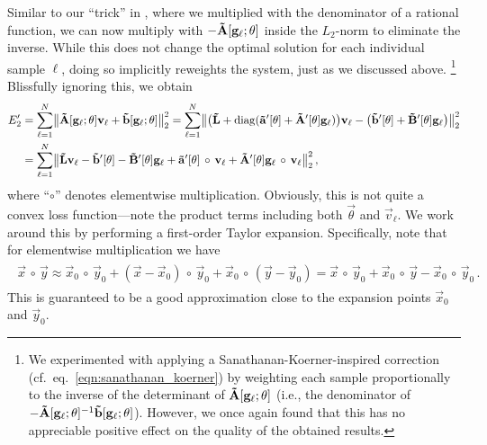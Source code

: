 Similar to our \enquote{trick} in , where we multiplied with the denominator of a rational function, we can now multiply with $-\mathbf{\tilde A}[\mathbf{g}_\ell; \mathbf{\theta}]$ inside the $L_2$-norm to eliminate the inverse.
While this does not change the optimal solution for each individual sample $\ell$, doing so implicitly reweights the system, just as we discussed above.%
\footnote{We experimented with applying a Sanathanan-Koerner-inspired correction (cf.~eq.~\ref{eqn:sanathanan_koerner}) by weighting each sample proportionally to the inverse of the determinant of $\mathbf{\tilde A}[\mathbf{g}_\ell; \mathbf{\theta}]$ (i.e., the denominator of $-\mathbf{\tilde A}[\mathbf{g}_\ell; \mathbf{\theta}]^{-1} \mathbf{\tilde b}[\mathbf{g}_\ell; \mathbf{\theta}]$).
However, we once again found that this has no appreciable positive effect on the quality of the obtained results.}
Blissfully ignoring this, we obtain
\begin{align*}
	E_2' &= \sum_{\ell = 1}^N \bigl\| \mathbf{\tilde A}[\mathbf{g}_\ell; \mathbf{\theta}] \mathbf{v}_\ell + \mathbf{\tilde b}[\mathbf{g}_\ell; \mathbf{\theta}] \bigr\|_2^2
	   = \sum_{\ell = 1}^N
	   \bigl\|
	   \bigl(\mathbf{\tilde L} + \operatorname{\mathrm{diag}}(\mathbf{\tilde a}'[\mathbf{\theta}] + \mathbf{\tilde A}'[\mathbf{\theta}] \mathbf{g}_\ell) \bigr) \mathbf{v}_\ell -
	  	  	        \bigl(\mathbf{\tilde b}'[\mathbf{\theta}] + \mathbf{\tilde B}'[\mathbf{\theta}] \mathbf{g}_\ell  \bigr)
	  \bigr\|_2^2 \\
	  &= \sum_{\ell = 1}^N
	  	   \bigl\|
	  	     \mathbf{\tilde L} \mathbf{v}_\ell
	  	   - \mathbf{\tilde b}'[\mathbf{\theta}] 
	  	   - \mathbf{\tilde B}'[\mathbf{\theta}] \mathbf{g}_\ell
	  	   + \mathbf{\tilde a}'[\mathbf{\theta}] \, \circ \, \mathbf{v}_\ell
	  	   + \mathbf{\tilde A}'[\mathbf{\theta}] \mathbf{g}_\ell \, \circ \, \mathbf{v}_\ell
 	  \bigr\|_2^2 \,,
\end{align*}
where \enquote{$\circ$} denotes elementwise multiplication.
Obviously, this is not quite a convex loss function---note the product terms including both $\vec \theta$ and $\vec v_\ell$. We work around this by performing a first-order Taylor expansion.
Specifically, note that for elementwise multiplication we have
\begin{align}
	\begin{aligned}
	\vec x \, \circ \, \vec y
	\approx \vec x_0 \, \circ \, \vec y_0 + (\vec x - \vec x_0) \, \circ \, \vec y_0 + \vec x_0 \, \circ \, (\vec y - \vec y_0)
	= \vec x \, \circ \, \vec y_0 + \vec x_0 \, \circ \, \vec y - \vec x_0 \, \circ \, \vec y_0 \,.
	\end{aligned}
	\label{eqn:nlif_e21}
\end{align}
This is guaranteed to be a good approximation close to the expansion points $\vec x_0$ and $\vec y_0$.

\pagebreak

